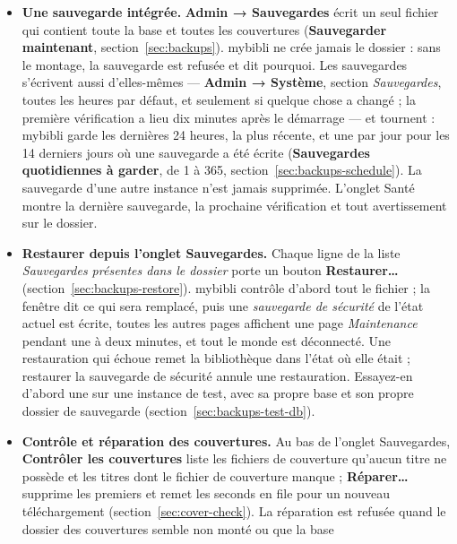 \begin{itemize}
  \item \textbf{Une sauvegarde intégrée.} \textbf{Admin → Sauvegardes}
        écrit un seul fichier qui contient toute la base et toutes les
        couvertures (\textbf{Sauvegarder maintenant},
        section~\ref{sec:backups}). mybibli ne crée jamais le dossier :
        sans le montage, la sauvegarde est refusée et dit pourquoi. Les
        sauvegardes s'écrivent aussi d'elles-mêmes --- \textbf{Admin →
        Système}, section \emph{Sauvegardes}, toutes les heures par
        défaut, et seulement si quelque chose a changé ; la première
        vérification a lieu dix minutes après le démarrage --- et
        tournent : mybibli garde les dernières 24 heures, la plus
        récente, et une par jour pour les 14 derniers jours où une
        sauvegarde a été écrite (\textbf{Sauvegardes quotidiennes à
        garder}, de 1 à 365, section~\ref{sec:backups-schedule}). La
        sauvegarde d'une autre instance n'est jamais supprimée. L'onglet
        Santé montre la dernière sauvegarde, la prochaine vérification
        et tout avertissement sur le dossier.
  \item \textbf{Restaurer depuis l'onglet Sauvegardes.} Chaque ligne de
        la liste \emph{Sauvegardes présentes dans le dossier} porte un
        bouton \textbf{Restaurer…} (section~\ref{sec:backups-restore}).
        mybibli contrôle d'abord tout le fichier ; la fenêtre dit ce qui
        sera remplacé, puis une \emph{sauvegarde de sécurité} de l'état
        actuel est écrite, toutes les autres pages affichent une page
        \emph{Maintenance} pendant une à deux minutes, et tout le monde
        est déconnecté. Une restauration qui échoue remet la
        bibliothèque dans l'état où elle était ; restaurer la sauvegarde
        de sécurité annule une restauration. Essayez-en d'abord une sur
        une instance de test, avec sa propre base et son propre dossier
        de sauvegarde (section~\ref{sec:backups-test-db}).
  \item \textbf{Contrôle et réparation des couvertures.} Au bas de
        l'onglet Sauvegardes, \textbf{Contrôler les couvertures} liste
        les fichiers de couverture qu'aucun titre ne possède et les
        titres dont le fichier de couverture manque ;
        \textbf{Réparer…} supprime les premiers et remet les seconds en
        file pour un nouveau téléchargement
        (section~\ref{sec:cover-check}). La réparation est refusée quand
        le dossier des couvertures semble non monté ou que la base

\end{itemize}
